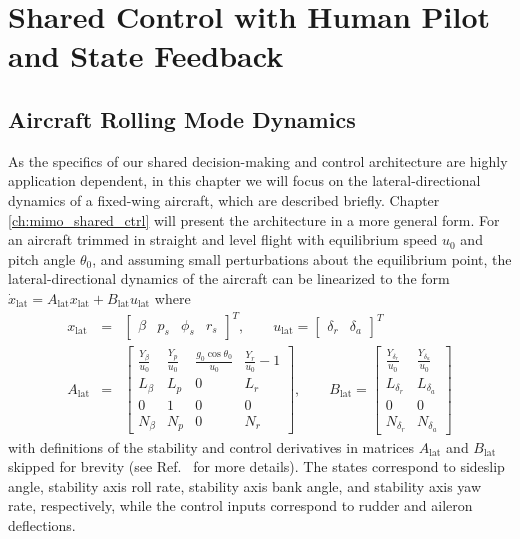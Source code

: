 \chapter{Shared Control with Human Pilot and State Feedback} \label{ch:siso_shared_ctrl}


\section{Aircraft Rolling Mode Dynamics}
As the specifics of our shared decision-making and control architecture are highly application dependent, in this chapter we will focus on the lateral-directional dynamics of a fixed-wing aircraft, which are described briefly. Chapter \ref{ch:mimo_shared_ctrl} will present the architecture in a more general form. For an aircraft trimmed in straight and level flight with equilibrium speed $u_0$ and pitch angle $\theta_0$, and assuming small perturbations about the equilibrium point, the lateral-directional dynamics of the aircraft can be linearized to the form $\dot{x}_{\mathrm{lat}} = A_{\mathrm{lat}} x_{\mathrm{lat}} + B_{\mathrm{lat}} u_{\mathrm{lat}}$ where
\begin{eqnarray}
	x_{\mathrm{lat}} &=& \begin{bmatrix}\beta & p_s & \phi_s & r_s \end{bmatrix}^T, \qquad u_{\mathrm{lat}} = \begin{bmatrix}\delta_r & \delta_a \end{bmatrix}^T \nonumber \\
	A_{\mathrm{lat}} &=& \begin{bmatrix}
			\frac{Y_\beta}{u_0} & \frac{Y_p}{u_0} & \frac{g_0\cos{\theta_0}}{u_0} & \frac{Y_r}{u_0} - 1 \\
			L_\beta & L_p & 0 & L_r \\
			0 & 1 & 0 & 0 \\
			N_\beta & N_p & 0 & N_r
		\end{bmatrix}, \qquad B_{\mathrm{lat}} = \begin{bmatrix}
			\frac{Y_{\delta_r}}{u_0} & \frac{Y_{\delta_a}}{u_0} \\
			L_{\delta_r} & L_{\delta_a} \\
			0 & 0 \\
			N_{\delta_r} & N_{\delta_a} 
		\end{bmatrix}
\end{eqnarray}
\noindent with definitions of the stability and control derivatives in matrices $A_{\mathrm{lat}}$ and $B_{\mathrm{lat}}$ skipped for brevity (see Ref.~\cite{lavretsky2013robust} for more details). The states correspond to sideslip angle, stability axis roll rate, stability axis bank angle, and stability axis yaw rate, respectively, while the control inputs correspond to rudder and aileron deflections.

